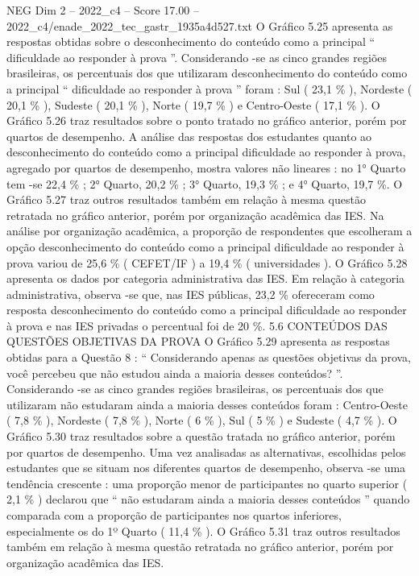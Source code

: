 \begin{textsample}{NEG Dim 2 – 2022\_c4 – Score 17.00 – 2022\_c4/enade\_2022\_tec\_gastr\_1935a4d527.txt}
O Gráfico 5.25 apresenta as respostas obtidas sobre o desconhecimento do conteúdo como a principal “ dificuldade ao responder à prova ”.
Considerando -se as cinco grandes regiões brasileiras, os percentuais dos que utilizaram desconhecimento do conteúdo como a principal “ dificuldade ao responder à prova ” foram : Sul ( 23,1 \% ), Nordeste ( 20,1 \% ), Sudeste ( 20,1 \% ), Norte ( 19,7 \% ) e Centro-Oeste ( 17,1 \% ).
O Gráfico 5.26 traz resultados sobre o ponto tratado no gráfico anterior, porém por quartos de desempenho.
A análise das respostas dos estudantes quanto ao desconhecimento do conteúdo como a principal dificuldade ao responder à prova, agregado por quartos de desempenho, mostra valores não lineares : no 1{\EmojiFont °} Quarto tem -se 22,4 \% ; 2{\EmojiFont °} Quarto, 20,2 \% ; 3{\EmojiFont °} Quarto, 19,3 \% ; e 4{\EmojiFont °} Quarto, 19,7 \%.
O Gráfico 5.27 traz outros resultados também em relação à mesma questão retratada no gráfico anterior, porém por organização acadêmica das IES.
Na análise por organização acadêmica, a proporção de respondentes que escolheram a opção desconhecimento do conteúdo como a principal dificuldade ao responder à prova variou de 25,6 \% ( CEFET/IF ) a 19,4 \% ( universidades ).
O Gráfico 5.28 apresenta os dados por categoria administrativa das IES.
Em relação à categoria administrativa, observa -se que, nas IES públicas, 23,2 \% ofereceram como resposta desconhecimento do conteúdo como a principal dificuldade ao responder à prova e nas IES privadas o percentual foi de 20 \%. 5.6 CONTEÚDOS DAS QUESTÕES OBJETIVAS DA PROVA O Gráfico 5.29 apresenta as respostas obtidas para a Questão 8 : “ Considerando apenas as questões objetivas da prova, você percebeu que não estudou ainda a maioria desses conteúdos? ”.
Considerando -se as cinco grandes regiões brasileiras, os percentuais dos que utilizaram não estudaram ainda a maioria desses conteúdos foram : Centro-Oeste ( 7,8 \% ), Nordeste ( 7,8 \% ), Norte ( 6 \% ), Sul ( 5 \% ) e Sudeste ( 4,7 \% ).
O Gráfico 5.30 traz resultados sobre a questão tratada no gráfico anterior, porém por quartos de desempenho.
Uma vez analisadas as alternativas, escolhidas pelos estudantes que se situam nos diferentes quartos de desempenho, observa -se uma tendência crescente : uma proporção menor de participantes no quarto superior ( 2,1 \% ) declarou que “ não estudaram ainda a maioria desses conteúdos ” quando comparada com a proporção de participantes nos quartos inferiores, especialmente os do 1º Quarto ( 11,4 \% ).
O Gráfico 5.31 traz outros resultados também em relação à mesma questão retratada no gráfico anterior, porém por organização acadêmica das IES.

\end{textsample}
